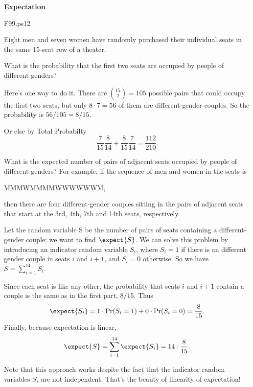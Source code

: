 \begin{problem}  \textbf{Expectation}
\begin{staffnotes}
F99.ps12
\end{staffnotes}

Eight men and seven women have randomly purchased their individual
seats in the same 15-seat row of a theater.

\bparts

\ppart What is the probability that the first two seats are occupied
by people of different genders?

\examspace[1.0in]

\begin{solution}
Here's one way to do it.  There are $\binom{15}{2} = 105$
possible pairs that could occupy the first two seats, but only $8\cdot7 =
56$ of them are different-gender couples.  So the probability is $56/105 =
8/15$.

Or else by Total Probabilty
\[
\frac{7}{15}\frac{8}{14} + \frac{8}{15}\frac{7}{14} = \frac{112}{210}.
\]
\end{solution}

\ppart What is the expected number of pairs of adjacent seats occupied
by people of different genders?  For example, if the sequence of men
and women in the seats is
\begin{center}
MMMWMMMMWWWWWWM,
\end{center}
then there are four different-gender couples sitting in the pairs of
adjacent seats that start at the 3rd, 4th, 7th and 14th seats,
respectively.

\examspace[1.4in]

\begin{solution}
Let the random variable S be the number of pairs of seats containing
a different-gender couple; we want to find $\expect{S}$.  We can solve
this problem by introducing an indicator random variable $S_i$, where
$S_i = 1$ if there is an different gender couple in seats $i$ and
$i+1$, and $S_i = 0$ otherwise.  So we have $S = \sum_{i=1}^{14} S_i$.

Since each seat is like any other, the probability that seats $i$ and
$i+1$ contain a couple is the same as in the first
part, $8/15$.  Thus
\[
\expect{S_i} = 1\cdot\Pr(S_i=1) + 0\cdot\Pr(S_i=0) = \frac{8}{15}.
\]
Finally, because expectation is linear,
\[
\expect{S} =  \sum_{i=1}^{14} \expect{S_i}  =  14\cdot \frac{8}{15}.
\]

Note that this approach works despite the fact that the indicator random
variables $S_i$ are not independent.  That's the beauty of linearity of
expectation!
\end{solution}

\eparts
\end{problem}

